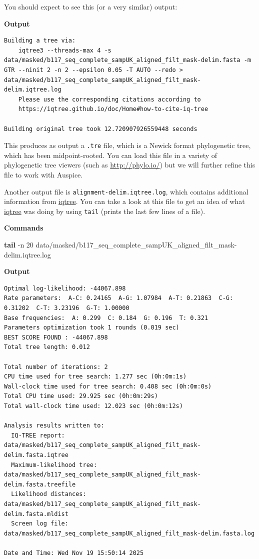 \documentclass[
]{book}
\newenvironment{Shaded}{\begin{snugshade}}{\end{snugshade}}
\newcommand{\AttributeTok}[1]{\textcolor[rgb]{0.13,0.29,0.53}{#1}}
\newcommand{\FunctionTok}[1]{\textcolor[rgb]{0.13,0.29,0.53}{\textbf{#1}}}
\newcommand{\NormalTok}[1]{#1}
\begin{document}
You should expect to see this (or a very similar) output:

\textbf{Output}

\begin{verbatim}
Building a tree via:
    iqtree3 --threads-max 4 -s data/masked/b117_seq_complete_sampUK_aligned_filt_mask-delim.fasta -m GTR --ninit 2 -n 2 --epsilon 0.05 -T AUTO --redo > data/masked/b117_seq_complete_sampUK_aligned_filt_mask-delim.iqtree.log
    Please use the corresponding citations according to
    https://iqtree.github.io/doc/Home#how-to-cite-iq-tree

Building original tree took 12.720907926559448 seconds
\end{verbatim}

This produces as output a \texttt{.tre} file, which is a Newick format phylogenetic tree, which has been midpoint-rooted. You can load this file in a variety of phylogenetic tree viewers (such as \url{http://phylo.io/}) but we will further refine this file to work with Auspice.

Another output file is \texttt{alignment-delim.iqtree.log}, which contains additional information from \href{http://www.iqtree.org/}{iqtree}. You can take a look at this file to get an idea of what \href{http://www.iqtree.org/}{iqtree} was doing by using \texttt{tail} (prints the last few lines of a file).

\textbf{Commands}

\begin{Shaded}
\begin{Highlighting}[]
\FunctionTok{tail} \AttributeTok{{-}n}\NormalTok{ 20 data/masked/b117\_seq\_complete\_sampUK\_aligned\_filt\_mask{-}delim.iqtree.log}
\end{Highlighting}
\end{Shaded}

\textbf{Output}

\begin{verbatim}
Optimal log-likelihood: -44067.898
Rate parameters:  A-C: 0.24165  A-G: 1.07984  A-T: 0.21863  C-G: 0.31202  C-T: 3.23196  G-T: 1.00000
Base frequencies:  A: 0.299  C: 0.184  G: 0.196  T: 0.321
Parameters optimization took 1 rounds (0.019 sec)
BEST SCORE FOUND : -44067.898
Total tree length: 0.012

Total number of iterations: 2
CPU time used for tree search: 1.277 sec (0h:0m:1s)
Wall-clock time used for tree search: 0.408 sec (0h:0m:0s)
Total CPU time used: 29.925 sec (0h:0m:29s)
Total wall-clock time used: 12.023 sec (0h:0m:12s)

Analysis results written to: 
  IQ-TREE report:                data/masked/b117_seq_complete_sampUK_aligned_filt_mask-delim.fasta.iqtree
  Maximum-likelihood tree:       data/masked/b117_seq_complete_sampUK_aligned_filt_mask-delim.fasta.treefile
  Likelihood distances:          data/masked/b117_seq_complete_sampUK_aligned_filt_mask-delim.fasta.mldist
  Screen log file:               data/masked/b117_seq_complete_sampUK_aligned_filt_mask-delim.fasta.log

Date and Time: Wed Nov 19 15:50:14 2025
\end{verbatim}
\end{document}
